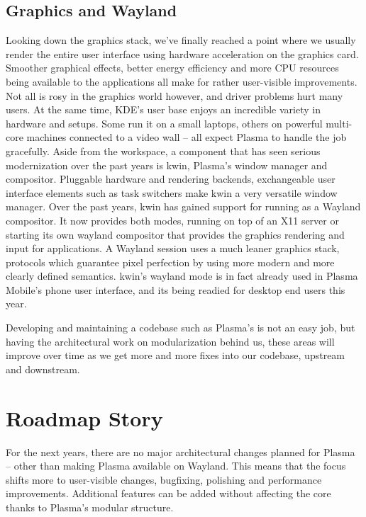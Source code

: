 \subsection*{Graphics and Wayland}

Looking down the graphics stack, we've finally reached a point where we usually render the entire user interface using hardware acceleration on the graphics card. Smoother graphical effects, better energy efficiency and more CPU resources being available to the applications all make for rather user-visible improvements. Not all is rosy in the graphics world however, and driver problems hurt many users. At the same time, KDE's user base enjoys an incredible variety in hardware and setups. Some run it on a small laptops, others on powerful multi-core machines connected to a video wall -- all expect Plasma to handle the job gracefully.
Aside from the workspace, a component that has seen serious modernization over the past years is kwin, Plasma's window manager and compositor. Pluggable hardware and rendering backends, exchangeable user interface elements such as task switchers make kwin a very versatile window manager. Over the past years, kwin has gained support for running as a Wayland compositor. It now provides both modes, running on top of an X11 server or starting its own wayland compositor that provides the graphics rendering and input for applications. A Wayland session uses a much leaner graphics stack, protocols which guarantee pixel perfection by using more modern and more clearly defined semantics. kwin's wayland mode is in fact already used in Plasma Mobile's phone user interface, and its being readied for desktop end users this year.

Developing and maintaining a codebase such as Plasma's is not an easy job, but having the architectural work on modularization behind us, these areas will improve over time as we get more and more fixes into our codebase, upstream and downstream.


\section*{Roadmap Story}

For the next years, there are no major architectural changes planned for Plasma -- other than making Plasma available on Wayland. This means that the focus shifts more to user-visible changes, bugfixing, polishing and performance improvements. Additional features can be added without affecting the core thanks to Plasma's modular structure.

